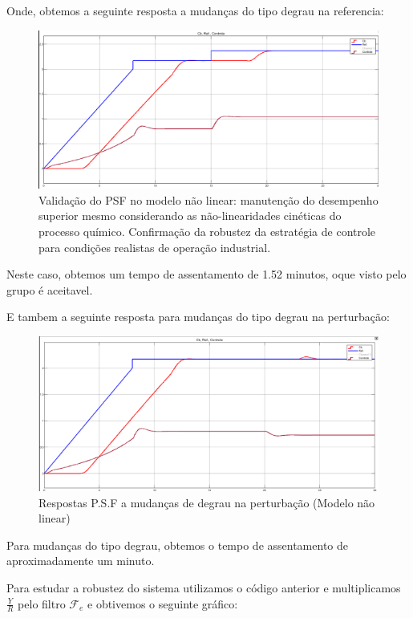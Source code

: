 \documentclass[a4paper,12pt]{article}
\begin{document}
Onde, obtemos a seguinte resposta a mudanças do tipo degrau na referencia:

\begin{figure} [H]
    \centering
    \includegraphics[width=0.9\linewidth]{image7.png}
    \caption{Validação do PSF no modelo não linear: manutenção do desempenho superior mesmo considerando as não-linearidades cinéticas do processo químico. Confirmação da robustez da estratégia de controle para condições realistas de operação industrial.}
    \label{fig:enter-label}
\end{figure}

Neste caso, obtemos um tempo de assentamento de 1.52 minutos, oque visto pelo grupo é aceitavel.

E tambem a seguinte resposta para mudanças do tipo degrau na perturbação:

\begin{figure} [H]
    \centering
    \includegraphics[width=0.9\linewidth]{image8.png}
    \caption{Respostas P.S.F a mudanças de degrau na perturbação (Modelo não linear)}
    \label{fig:enter-label}
\end{figure}

Para mudanças do tipo degrau, obtemos o tempo de assentamento de
aproximadamente um minuto.


Para estudar a robustez do sistema utilizamos o código anterior e multiplicamos \(\frac{Y}{R}\) pelo filtro \(\mathcal{F}_e\) e obtivemos o seguinte gráfico:
\end{document}
